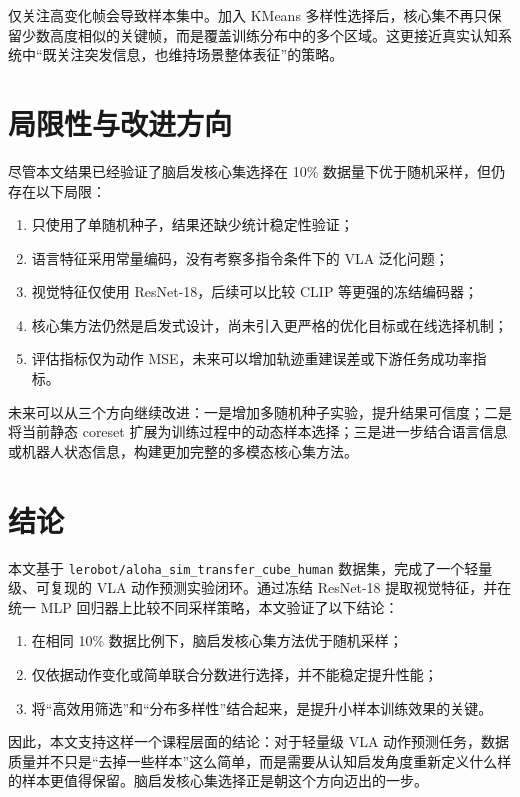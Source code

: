 \documentclass[UTF8,a4paper,12pt]{ctexart}
\begin{document}
仅关注高变化帧会导致样本集中。加入 KMeans 多样性选择后，核心集不再只保留少数高度相似的关键帧，而是覆盖训练分布中的多个区域。这更接近真实认知系统中“既关注突发信息，也维持场景整体表征”的策略。

\section{局限性与改进方向}

尽管本文结果已经验证了脑启发核心集选择在 10\% 数据量下优于随机采样，但仍存在以下局限：
\begin{enumerate}
  \item 只使用了单随机种子，结果还缺少统计稳定性验证；
  \item 语言特征采用常量编码，没有考察多指令条件下的 VLA 泛化问题；
  \item 视觉特征仅使用 ResNet-18，后续可以比较 CLIP 等更强的冻结编码器；
  \item 核心集方法仍然是启发式设计，尚未引入更严格的优化目标或在线选择机制；
  \item 评估指标仅为动作 MSE，未来可以增加轨迹重建误差或下游任务成功率指标。
\end{enumerate}

未来可以从三个方向继续改进：一是增加多随机种子实验，提升结果可信度；二是将当前静态 coreset 扩展为训练过程中的动态样本选择；三是进一步结合语言信息或机器人状态信息，构建更加完整的多模态核心集方法。

\section{结论}

本文基于 \texttt{lerobot/aloha\_sim\_transfer\_cube\_human} 数据集，完成了一个轻量级、可复现的 VLA 动作预测实验闭环。通过冻结 ResNet-18 提取视觉特征，并在统一 MLP 回归器上比较不同采样策略，本文验证了以下结论：
\begin{enumerate}
  \item 在相同 10\% 数据比例下，脑启发核心集方法优于随机采样；
  \item 仅依据动作变化或简单联合分数进行选择，并不能稳定提升性能；
  \item 将“高效用筛选”和“分布多样性”结合起来，是提升小样本训练效果的关键。
\end{enumerate}

因此，本文支持这样一个课程层面的结论：对于轻量级 VLA 动作预测任务，数据质量并不只是“去掉一些样本”这么简单，而是需要从认知启发角度重新定义什么样的样本更值得保留。脑启发核心集选择正是朝这个方向迈出的一步。
\end{document}
